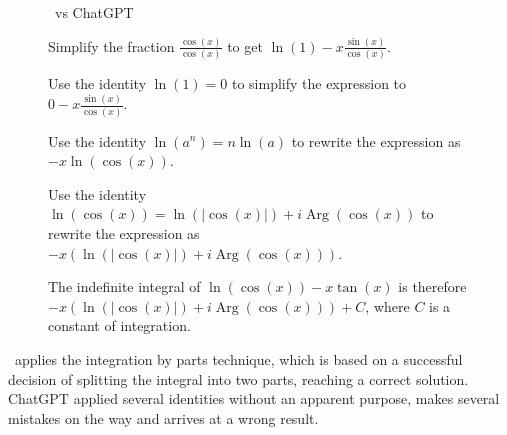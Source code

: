 \begin{figure}[H]
\begin{AIbox}{\DV \ vs ChatGPT}
{Simplify the fraction $\frac{\cos(x)}{\cos(x)}$ to get $\ln(1) - x\frac{\sin(x)}{\cos(x)}$.

Use the identity $\ln(1) = 0$ to simplify the expression to $0 - x\frac{\sin(x)}{\cos(x)}$.

Use the identity $\ln(a^n) = n\ln(a)$ to rewrite the expression as $-x\ln(\cos(x))$.

Use the identity $\ln(\cos(x)) = \ln(|\cos(x)|) + i\operatorname{Arg}(\cos(x))$ to rewrite the expression as $-x(\ln(|\cos(x)|) + i\operatorname{Arg}(\cos(x)))$.

The indefinite integral of $\ln(\cos(x)) - x\tan(x)$ is therefore $-x(\ln(|\cos(x)|) + i\operatorname{Arg}(\cos(x))) + C$, where $C$ is a constant of integration.
}
\end{AIbox}
\end{figure}

\DV \ applies the integration by parts technique, which is based on a successful decision of splitting the integral into two parts, reaching a correct solution. ChatGPT applied several identities without an apparent purpose, makes several mistakes on the way and arrives at a wrong result. \\

